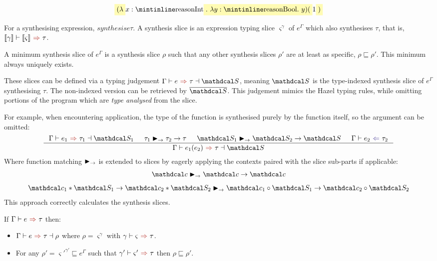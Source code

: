 \[\hlcmaths[yellow!30]{(\lambda} x: \code{Int}\hlcmaths[yellow!30]{.\ \lambda y : \code{Bool}.\ y)(}1\hlcmaths[yellow!30]{)}\]

\begin{definition}
For a synthesising expression, $synthesis{e}{\tau}$. A synthesis slice is an expression typing slice $\varsigma^{\gamma}$ of $e^\Gamma$ which also synthesises $\tau$, that is, $\synthesis[\type{\gamma}]{\type{\varsigma}}{\tau}$.
\end{definition}
\begin{proposition}
A minimum synthesis slice of $e^\Gamma$ is a synthesis slice $\rho$ such that any other synthesis slices $\rho'$ are at least as specific, $\rho \sqsubseteq \rho'$. This minimum always uniquely exists.
\end{proposition}

These slices can be defined via a typing judgement $\synthesisslice{e}{\tau}{\S}$, meaning $\S$ is the type-indexed synthesis slice of $e^\Gamma$ synthesising $\tau$. The non-indexed version can be retrieved by $\overline{\S}$. This judgement mimics the Hazel typing rules, while omitting portions of the program which are \textit{type analysed} from the slice.  

For example, when encountering application, the type of the function is synthesised purely by the function itself, so the argument can be omitted:
\[\inference{\synthesisslice{e_1}{\tau_1}{\S_1} & \tau_1 \funmatch \tau_2 \to \tau & \S_1 \funmatch \S_2 \to \S & \analysis{e_2}{\tau_2}}{\synthesisslice{e_1(e_2)}{\tau}{\S}}\]
Where function matching $\blacktriangleright_\rightarrow$ is extended to slices by eagerly applying the contexts paired with the slice sub-parts if applicable:
\[\Cs \funmatch \Cs \to \Cs\]
\[\Cs_1 * \S_1 \to \Cs_2 * \S_2 \funmatch \Cs_1 \circ \S_1 \to \Cs_2 \circ \S_2\]
This approach correctly calculates the synthesis slices.
\begin{conjecture}[Correctness]
\label{conj:SynthesisSliceCorrectness}
If $\synthesis{e}{\tau}$ then:
\begin{itemize}
\item $\synthesisslice{e}{\tau}{\rho}$ where $\rho = \varsigma^\gamma$ with $\synthesis[\gamma]{\varsigma}{\tau}$.
\item For any $\rho' = \varsigma'^{\gamma'} \sqsubseteq e^\Gamma$ such that $\synthesis[\gamma']{\varsigma'}{\tau}$ then $\rho \sqsubseteq \rho'$.
\end{itemize}
\end{conjecture}

